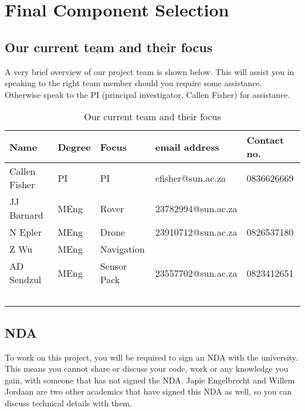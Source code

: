\chapter{Final Component Selection}

\section{Our current team and their focus}
	
	A very brief overview of our project team is shown below. This will assist you in speaking to the right team member should you require some assistance. Otherwise speak to the PI (principal investigator, Callen Fisher) for assistance.
	
	\begin{table}[H]
		\caption{Our current team and their focus}
		\label{tab:ourTeam}
		\begin{tabular}{|l|l|l|l|l|}
			\hline
			Name          & Degree & Focus      & email address     & Contact no.\\
			\hline
			Callen Fisher & PI    & PI          & cfisher@sun.ac.za  & 0836626669\\
			JJ Barnard    & MEng  & Rover       & 23782994@sun.ac.za & \\
			N Epler       & MEng  & Drone       & 23910712@sun.ac.za & 0826537180\\
			Z Wu		  & MEng  & Navigation  & 					  & \\
			AD Sendzul    & MEng  & Sensor Pack & 23557702@sun.ac.za & 0823412651\\
			              &        &                 &                    & \\
			              &        &                 &                    & \\
			              &        &                 &                    & \\
			              &        &                 &                    & \\
			              &        &  	             &                    & \\ \hline 
		\end{tabular}
	\end{table}

\section{NDA}
	To work on this project, you will be required to sign an NDA with the university. This means you cannot share or discuss your code, work or any knowledge you gain, with someone that has not signed the NDA. Japie Engelbrecht and Willem Jordaan are two other academics that have signed this NDA as well, so you can discuss technical details with them.
	
